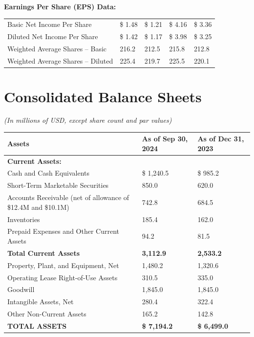 \documentclass[10pt,a4paper]{article}
\begin{document}
\vspace{3pt}
{\small\bfseries Earnings Per Share (EPS) Data:}

\vspace{1pt}
\begin{tabularx}{\textwidth}{K M M M M}
\toprule
Basic Net Income Per Share & \$ 1.48 & \$ 1.21 & \$ 4.16 & \$ 3.36 \\{}
Diluted Net Income Per Share & \$ 1.42 & \$ 1.17 & \$ 3.98 & \$ 3.25 \\{}
Weighted Average Shares -- Basic & 216.2 & 212.5 & 215.8 & 212.8 \\{}
Weighted Average Shares -- Diluted & 225.4 & 219.7 & 225.5 & 220.1 \\
\bottomrule
\end{tabularx}

\clearpage


\section{Consolidated Balance Sheets}
{\small\itshape (In millions of USD, except share count and par values)}

\vspace{-2pt}
\begin{tabularx}{\textwidth}{K M M}
\toprule
{}
\color{white}\bfseries Assets & \color{white}\bfseries As of Sep 30, 2024 & \color{white}\bfseries As of Dec 31, 2023 \\
\midrule
\textbf{Current Assets:} & & \\{}
\quad Cash and Cash Equivalents & \$ 1,240.5 & \$ 985.2 \\{}
\quad Short-Term Marketable Securities & 850.0 & 620.0 \\{}
\quad Accounts Receivable (net of allowance of \$12.4M and \$10.1M) & 742.8 & 684.5 \\{}
\quad Inventories & 185.4 & 162.0 \\{}
\quad Prepaid Expenses and Other Current Assets & 94.2 & 81.5 \\
\cmidrule(lr){2-3}
\quad \textbf{Total Current Assets} & \textbf{3,112.9} & \textbf{2,533.2} \\{}
Property, Plant, and Equipment, Net & 1,480.2 & 1,320.6 \\{}
Operating Lease Right-of-Use Assets & 310.5 & 335.0 \\{}
Goodwill & 1,845.0 & 1,845.0 \\{}
Intangible Assets, Net & 280.4 & 322.4 \\{}
Other Non-Current Assets & 165.2 & 142.8 \\
\midrule
\textbf{TOTAL ASSETS} & \textbf{\$ 7,194.2} & \textbf{\$ 6,499.0} \\
\bottomrule
\end{tabularx}
\end{document}
